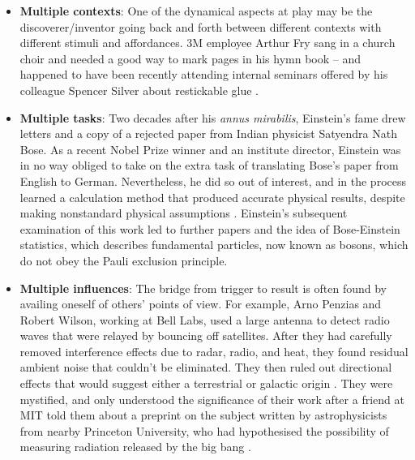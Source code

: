 \begin{itemize}
\item \textbf{Multiple contexts}: One of the dynamical aspects at play
  may be the discoverer/inventor going back and forth between
  different contexts with different stimuli and affordances.  3M
  employee Arthur Fry sang in a church choir and needed a good way to
  mark pages in his hymn book -- and happened to have been recently
  attending internal seminars offered by his colleague Spencer Silver
  about restickable glue \cite{tce-postits}.
\end{itemize}


\begin{itemize}
\item \textbf{Multiple tasks}: Two decades after his \emph{annus
  mirabilis}, Einstein's fame drew letters and a copy of a rejected
  paper from Indian physicist Satyendra Nath Bose.  As a recent Nobel
  Prize winner and an institute director, Einstein was in no way
  obliged to take on the extra task of translating Bose's paper from
  English to German.  Nevertheless, he did so out of interest, and in
  the process learned a calculation method that produced accurate
  physical results, despite making nonstandard physical assumptions
  \cite{delbruck1980bose}.  Einstein's subsequent examination of this
  work led to further papers and the idea of Bose-Einstein statistics,
  which describes fundamental particles, now known as bosons, which do
  not obey the Pauli exclusion principle.
\end{itemize}

\begin{itemize}
\item \textbf{Multiple influences}: The bridge from trigger to result
  is often found by availing oneself of others' points of view.  For
  example, Arno Penzias and Robert Wilson, working at Bell Labs, used
  a large antenna to detect radio waves that were relayed by bouncing
  off satellites.  After they had carefully removed interference
  effects due to radar, radio, and heat, they found residual ambient
  noise that couldn't be eliminated.  They then ruled out directional
  effects that would suggest either a terrestrial or galactic origin
  \cite[p.~3]{lachieze1999cosmological}.  They were mystified, and
  only understood the significance of their work after a friend at MIT
  told them about a preprint on the subject written by astrophysicists
  from nearby Princeton University, who had hypothesised the
  possibility of measuring radiation released by the big bang
  \cite[p.~385]{shu1982physical}.
\end{itemize}


